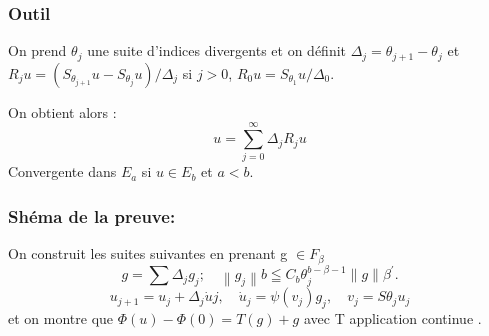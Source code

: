 \documentclass[10pt]{beamer}
\begin{document}
\begin{frame}
\frametitle{Outil}
On prend $\theta_j$ une suite d'indices divergents et on définit $\Delta_j= \theta_{j+1} - \theta_{j}$ et $R_j u=\left(S_{\theta_{j+1}} u-S_{\theta_j} u\right) / \Delta_j$ si $j>0$, $R_0 u=S_{\theta_1} u / \Delta_0$.

On obtient alors :
\[ u=\sum_{j=0}^{\infty} \Delta_j R_j u \]
Convergente dans $E_a$ si $u \in E_b$ et $a < b$.
\end{frame}

\begin{frame}
\frametitle{Shéma de la preuve:}
On construit les suites suivantes en prenant g $\in F_\beta$
$$
g=\sum \Delta_j g_j ; \quad\left\|g_j\right\|b \leqq C_b \theta_j^{b-\beta-1}\|g\|\beta^{\prime} .
$$
$$
u_{j+1}=u_j+\Delta_j \dot{u}j, \quad \dot{u}_j=\psi\left(v_j\right) g_j, \quad v_j=S{\theta_j} u_j
$$
et on montre que $\Phi(u) -\Phi(0) = T(g) + g$ avec T application continue . 
\end{frame}
\end{document}
